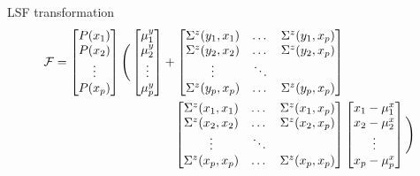 LSF transformation
\begin{equation}
	\begin{split}
		\mathcal F=\begin{bmatrix}
			P(x_1) \\
			P(x_2) \\
			\vdots \\
			P(x_p) \\
		\end{bmatrix}\Bigg(
		\begin{bmatrix}
			\mu_1^y \\
			\mu_2^y \\
			\vdots \\
			\mu_p^y
		\end{bmatrix} + 
		\begin{bmatrix}
			\Sigma^z(y_1,x_1) & \dots & \Sigma^z(y_1,x_p) \\
			\Sigma^z(y_2,x_2) & \dots & \Sigma^z(y_2,x_p)\\
			\vdots & \ddots & \\
			\Sigma^z(y_p,x_p) & \dots & \Sigma^z(y_p,x_p)\\
		\end{bmatrix} & \\
		\begin{bmatrix}
			\Sigma^z(x_1,x_1) & \dots & \Sigma^z(x_1,x_p) \\
			\Sigma^z(x_2,x_2) & \dots & \Sigma^z(x_2,x_p)\\
			\vdots & \ddots & \\
			\Sigma^z(x_p,x_p) & \dots & \Sigma^z(x_p,x_p)\\
		\end{bmatrix} &
		\begin{bmatrix}
			x_1 - \mu_1^x \\
			x_2 - \mu_2^x \\
			\vdots \\
			x_p - \mu_p^x \\
		\end{bmatrix}\Bigg)
	\end{split}
\end{equation}

